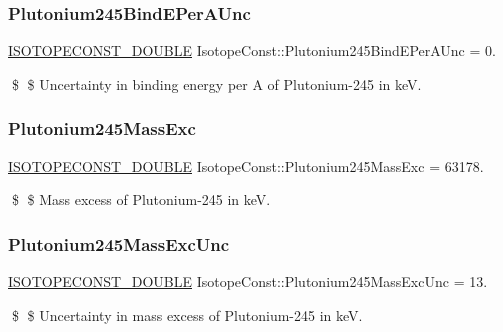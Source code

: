 \subsubsection{\texorpdfstring{Plutonium245\+Bind\+E\+Per\+A\+Unc}{Plutonium245BindEPerAUnc}}
{\footnotesize\ttfamily \mbox{\hyperlink{group___isotope_const-_macros_ga8f45a7272ce02c0b4c65c44636ed719a}{I\+S\+O\+T\+O\+P\+E\+C\+O\+N\+S\+T\+\_\+\+D\+O\+U\+B\+LE}} Isotope\+Const\+::\+Plutonium245\+Bind\+E\+Per\+A\+Unc = 0.}

\$ \$ Uncertainty in binding energy per A of Plutonium-\/245 in keV. \mbox{\label{group___isotope_const-_plutonium-_pu245_ga1d7a2fb0a2ec7a9a26b8f76201cc2ba7}} 
\subsubsection{\texorpdfstring{Plutonium245\+Mass\+Exc}{Plutonium245MassExc}}
{\footnotesize\ttfamily \mbox{\hyperlink{group___isotope_const-_macros_ga8f45a7272ce02c0b4c65c44636ed719a}{I\+S\+O\+T\+O\+P\+E\+C\+O\+N\+S\+T\+\_\+\+D\+O\+U\+B\+LE}} Isotope\+Const\+::\+Plutonium245\+Mass\+Exc = 63178.}

\$ \$ Mass excess of Plutonium-\/245 in keV. \mbox{\label{group___isotope_const-_plutonium-_pu245_ga7dd3570f7dd5bc5ef62102027167d93c}} 
\subsubsection{\texorpdfstring{Plutonium245\+Mass\+Exc\+Unc}{Plutonium245MassExcUnc}}
{\footnotesize\ttfamily \mbox{\hyperlink{group___isotope_const-_macros_ga8f45a7272ce02c0b4c65c44636ed719a}{I\+S\+O\+T\+O\+P\+E\+C\+O\+N\+S\+T\+\_\+\+D\+O\+U\+B\+LE}} Isotope\+Const\+::\+Plutonium245\+Mass\+Exc\+Unc = 13.}

\$ \$ Uncertainty in mass excess of Plutonium-\/245 in keV. \mbox{\label{group___isotope_const-_plutonium-_pu245_gafa751be40f2111b52a1713e81c0e15b4}} 
